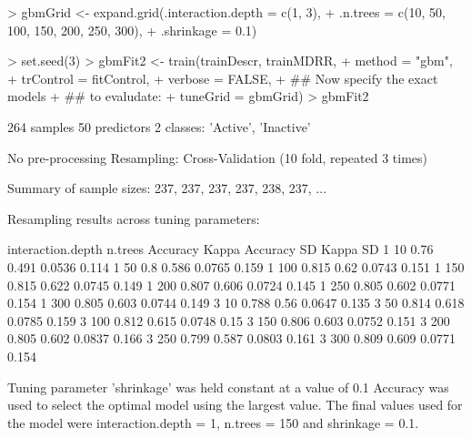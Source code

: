 \documentclass[12pt]{article}
\renewenvironment{Schunk}{\vspace{\topsep}}{\vspace{\topsep}}
\begin{document}
\begin{small}
\begin{Schunk}
\begin{Sinput}
> gbmGrid <-  expand.grid(.interaction.depth = c(1, 3), 
+                         .n.trees = c(10, 50, 100, 150, 200, 250, 300), 
+                         .shrinkage = 0.1)
\end{Sinput}
\end{Schunk}

\begin{Schunk}
\begin{Sinput}
> set.seed(3)
> gbmFit2 <- train(trainDescr, trainMDRR, 
+                  method = "gbm", 
+                  trControl = fitControl, 
+                  verbose = FALSE, 
+                  ## Now specify the exact models 
+                  ## to evaludate:
+                  tuneGrid = gbmGrid)
> gbmFit2
\end{Sinput}
\begin{Soutput}
264 samples
 50 predictors
  2 classes: 'Active', 'Inactive' 

No pre-processing
Resampling: Cross-Validation (10 fold, repeated 3 times) 

Summary of sample sizes: 237, 237, 237, 237, 238, 237, ... 

Resampling results across tuning parameters:

  interaction.depth  n.trees  Accuracy  Kappa  Accuracy SD  Kappa SD
  1                  10       0.76      0.491  0.0536       0.114   
  1                  50       0.8       0.586  0.0765       0.159   
  1                  100      0.815     0.62   0.0743       0.151   
  1                  150      0.815     0.622  0.0745       0.149   
  1                  200      0.807     0.606  0.0724       0.145   
  1                  250      0.805     0.602  0.0771       0.154   
  1                  300      0.805     0.603  0.0744       0.149   
  3                  10       0.788     0.56   0.0647       0.135   
  3                  50       0.814     0.618  0.0785       0.159   
  3                  100      0.812     0.615  0.0748       0.15    
  3                  150      0.806     0.603  0.0752       0.151   
  3                  200      0.805     0.602  0.0837       0.166   
  3                  250      0.799     0.587  0.0803       0.161   
  3                  300      0.809     0.609  0.0771       0.154   

Tuning parameter 'shrinkage' was held constant at a value of 0.1
Accuracy was used to select the optimal model using  the largest value.
The final values used for the model were interaction.depth = 1, n.trees =
 150 and shrinkage = 0.1. 
\end{Soutput}
\end{Schunk}

\end{small}
\end{document}
